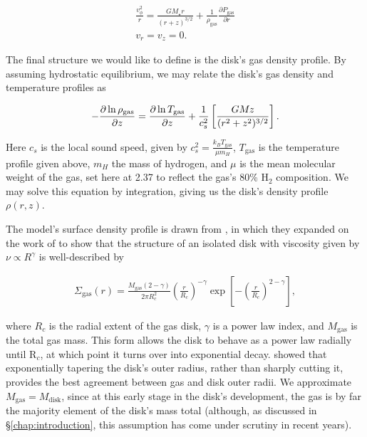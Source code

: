 \begin{align}
  \frac{v_\phi^2}{r} = \frac{GM_\star r}{(r + z)^{3/2}} + \frac{1}{\rho_\text{gas}} \frac{\partial P_\text{gas}}{\partial r} \\
  v_r = v_z = 0.
\end{align}


The final structure we would like to define is the disk's gas density profile. By assuming hydrostatic equilibrium, we may relate the disk's gas density and temperature profiles as

\begin{align}
  -\frac{\partial \ln \rho_\text{gas}}{\partial z} = \frac{\partial \ln T_\text{gas}}{\partial z} + \frac{1}{c_s^2} \left[\frac{G M_{\*} z}{(r^2 + z^2)^{3/2}} \right].
\end{align}

Here $c_s$ is the local sound speed, given by $c_s^2 = \frac{k_B T_\text{gas}}{\mu m_H}$, $T_\text{gas}$ is the temperature profile given above, $m_H$ the mass of hydrogen, and $\mu$ is the mean molecular weight of the gas, set here at 2.37 to reflect the gas's 80\% H$_2$ composition. We may solve this equation by integration, giving us the disk's density profile $\rho(r, z)$.


The model's surface density profile is drawn from \citet{Hartmann1998}, in which they expanded on the work of \citet{LyndenBell1974} to show that the structure of an isolated disk with viscosity given by $\nu \propto R^\gamma$ is well-described by



\begin{align}
  \Sigma_{\text{gas}}(r) = \frac{M_{\text{gas}} (2 - \gamma)}{2 \pi R_c^2} \left(\frac{r}{R_c} \right)^{-\gamma} \exp \left[-\left(\frac{r}{R_c} \right)^{2-\gamma} \right],
\end{align}

\noindent

where $R_c$ is the radial extent of the gas disk, $\gamma$ is a power law index, and $M_\text{gas}$ is the total gas mass. This form allows the disk to behave as a power law radially until R$_c$, at which point it turns over into exponential decay. \citet{Hughes2008} showed that exponentially tapering the disk's outer radius, rather than sharply cutting it, provides the best agreement between gas and disk outer radii. We approximate $M_\text{gas} = M_\text{disk}$, since at this early stage in the disk's development, the gas is by far the majority element of the disk's mass total (although, as discussed in \S\ref{chap:introduction}, this assumption has come under scrutiny in recent years).

